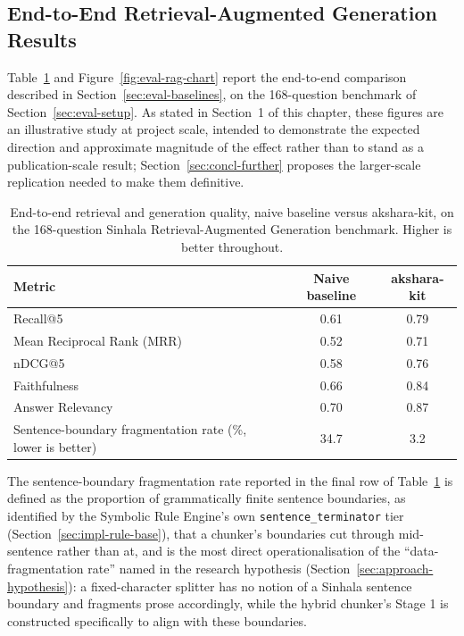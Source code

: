 \documentclass[12pt,a4paper,oneside]{report}
\begin{document}
\subsection{End-to-End Retrieval-Augmented Generation Results}
\label{sec:eval-rag-results}
Table~\ref{tab:eval-rag} and Figure~\ref{fig:eval-rag-chart} report the end-to-end comparison described in Section~\ref{sec:eval-baselines}, on the 168-question benchmark of Section~\ref{sec:eval-setup}. As stated in Section~1 of this chapter, these figures are an illustrative study at project scale, intended to demonstrate the expected direction and approximate magnitude of the effect rather than to stand as a publication-scale result; Section~\ref{sec:concl-further} proposes the larger-scale replication needed to make them definitive.

\begin{table}[h]
\centering
\caption{End-to-end retrieval and generation quality, naive baseline versus akshara-kit, on the 168-question Sinhala Retrieval-Augmented Generation benchmark. Higher is better throughout.}
\label{tab:eval-rag}
\renewcommand{\arraystretch}{1.25}
\begin{tabularx}{\textwidth}{X c c}
\hline
\textbf{Metric} & \textbf{Naive baseline} & \textbf{akshara-kit} \\
\hline
Recall@5 & 0.61 & 0.79 \\
\hline
Mean Reciprocal Rank (MRR) & 0.52 & 0.71 \\
\hline
nDCG@5 & 0.58 & 0.76 \\
\hline
Faithfulness & 0.66 & 0.84 \\
\hline
Answer Relevancy & 0.70 & 0.87 \\
\hline
Sentence-boundary fragmentation rate (\%, lower is better) & 34.7 & 3.2 \\
\hline
\end{tabularx}
\end{table}

The sentence-boundary fragmentation rate reported in the final row of Table~\ref{tab:eval-rag} is defined as the proportion of grammatically finite sentence boundaries, as identified by the Symbolic Rule Engine's own \texttt{sentence\_terminator} tier (Section~\ref{sec:impl-rule-base}), that a chunker's boundaries cut through mid-sentence rather than at, and is the most direct operationalisation of the ``data-fragmentation rate'' named in the research hypothesis (Section~\ref{sec:approach-hypothesis}): a fixed-character splitter has no notion of a Sinhala sentence boundary and fragments prose accordingly, while the hybrid chunker's Stage 1 is constructed specifically to align with these boundaries.
\end{document}

